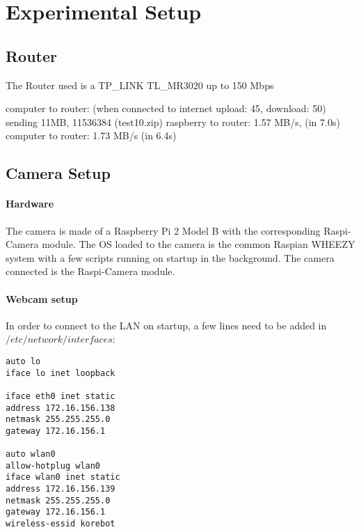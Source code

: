 \newpage
\section{Experimental Setup}

\subsection{Router}

The Router used is a TP\_LINK TL\_MR3020
up to 150 Mbps 

computer to router: (when connected to internet upload: 45, download: 50)
sending 11MB, 11536384 (test10.zip)
raspberry to router:
1.57 MB/s, (in 7.0s)
computer to router:
1.73 MB/s (in 6.4s)




\subsection{Camera Setup}

\paragraph{Hardware} The camera is made of a Raspberry Pi 2 Model B with the corresponding Raspi-Camera module. The OS loaded to the camera is the common Raspian WHEEZY system with a few scripts running on startup in the background. The camera connected is the Raspi-Camera module.

\paragraph{Webcam setup} In order to connect to the LAN on startup, a few lines need to be added in $/etc/network/interfaces$: 

\begin{center}
\begin{minipage}{0.9\linewidth}
\begin{lstlisting}[caption=$/etc/network/interfaces$, label=interfaces, frame=none]
auto lo
iface lo inet loopback

iface eth0 inet static
address 172.16.156.138
netmask 255.255.255.0
gateway 172.16.156.1

auto wlan0
allow-hotplug wlan0
iface wlan0 inet static
address 172.16.156.139
netmask 255.255.255.0
gateway 172.16.156.1
wireless-essid korebot
\end{lstlisting}
\end{minipage}
\end{center}


